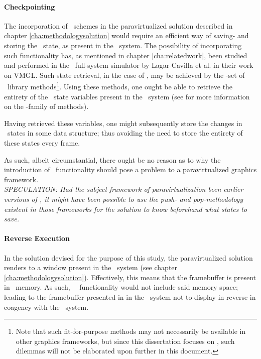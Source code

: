 \paragraph{Checkpointing}
\label{par:discussion_checkpointing}
The incorporation of \dvttermcheckpointrestart\ schemes in the paravirtualized solution described in chapter \ref{cha:methodologysolution} would require an efficient way of saving- and storing the \dvttermopengl\ state, as present in the \dvttermhost\ system.
The possibility of incorporating such functionality has, as mentioned in chapter \ref{cha:relatedwork}, been studied and performed in the \dvttermqemu\ full-system simulator by Lagar-Cavilla et al. in their work on VMGL.
Such state retrieval, in the case of \dvttermopenglestwopointo , may be achieved by the -set of \dvttermopengl\ library methods\footnote{Note that such fit-for-purpose methods may not necessarily be available in other graphics frameworks, but since this dissertation focuses on \dvttermopenglestwopointo , such dilemmas will not be elaborated upon further in this document.}.
Using these methods, one ought be able to retrieve the entirety of the \dvttermopengl\ state variables present in the \dvttermhost\ system (see  for more information on the -family of methods).

Having retrieved these variables, one might subsequently store the changes in \dvttermopengl\ states in some data structure; thus avoiding the need to store the entirety of these states every frame.

As such, albeit circumstantial, there ought be no reason as to why the introduction of \dvttermcheckpoint\ functionality should pose a problem to a paravirtualized graphics framework.\\

\textit{SPECULATION: Had the subject framework of paravirtualization been earlier versions of \dvttermopengl , it might have been possible to use the push- and pop-methodology existent in those frameworks for the solution to know beforehand what states to save.}

\paragraph{Reverse Execution}
\label{par:discussion_reverseexecution}
In the solution devised for the purpose of this study, the paravirtualized solution renders to a window present in the \dvttermhost\ system (see chapter \ref{cha:methodologysolution}).
Effectively, this means that the framebuffer is present in \dvttermhost\ memory.
As such, \dvttermsimics\ \dvttermreverseexecution\ functionality would not include said memory space; leading to the framebuffer presented in in the \dvttermhost\ system not to display in reverse in coagency with the  \dvttermtarget\ system.

